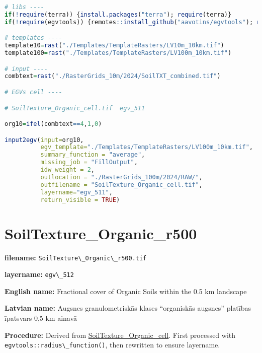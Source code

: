 \documentclass[
]{book}
\newcommand{\passthrough}[1]{#1}
\begin{document}
\begin{lstlisting}[language=R]
# libs ----
if(!require(terra)) {install.packages("terra"); require(terra)}
if(!require(egvtools)) {remotes::install_github("aavotins/egvtools"); require(egvtools)}

# templates ----
template10=rast("./Templates/TemplateRasters/LV10m_10km.tif")
template100=rast("./Templates/TemplateRasters/LV100m_10km.tif")

# input ----
combtext=rast("./RasterGrids_10m/2024/SoilTXT_combined.tif")

# EGVs cell ----

# SoilTexture_Organic_cell.tif  egv_511

org10=ifel(combtext==4,1,0)

input2egv(input=org10,
          egv_template="./Templates/TemplateRasters/LV100m_10km.tif",
          summary_function = "average",
          missing_job = "FillOutput",
          idw_weight = 2,
          outlocation = "./RasterGrids_100m/2024/RAW/",
          outfilename = "SoilTexture_Organic_cell.tif",
          layername="egv_511",
          return_visible = TRUE)
\end{lstlisting}

\section{SoilTexture\_Organic\_r500}\label{ch06.512}

\textbf{filename:} \passthrough{\lstinline!SoilTexture\_Organic\_r500.tif!}

\textbf{layername:} \passthrough{\lstinline!egv\_512!}

\textbf{English name:} Fractional cover of Organic Soils within the 0.5 km landscape

\textbf{Latvian name:} Augsnes granulometriskās klases ``organiskās augsnes'' platības īpatsvars 0,5 km ainavā

\textbf{Procedure:} Derived from \hyperref[ch06.511]{SoilTexture\_Organic\_cell}. First processed
with \passthrough{\lstinline!egvtools::radius\_function()!}, then rewritten to ensure layername.
\end{document}
